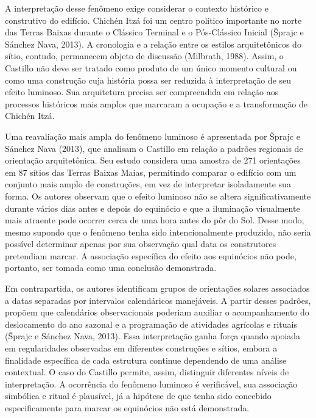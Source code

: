 \documentclass[11pt, a4paper]{article}
\begin{document}
A interpretação desse fenômeno exige considerar o contexto histórico e construtivo do edifício. Chichén Itzá foi um centro político importante no norte das Terras Baixas durante o Clássico Terminal e o Pós-Clássico Inicial (Šprajc e Sánchez Nava, 2013). A cronologia e a relação entre os estilos arquitetônicos do sítio, contudo, permanecem objeto de discussão (Milbrath, 1988). Assim, o Castillo não deve ser tratado como produto de um único momento cultural ou como uma construção cuja história possa ser reduzida à interpretação de seu efeito luminoso. Sua arquitetura precisa ser compreendida em relação aos processos históricos mais amplos que marcaram a ocupação e a transformação de Chichén Itzá.

Uma reavaliação mais ampla do fenômeno luminoso é apresentada por Šprajc e Sánchez Nava (2013), que analisam o Castillo em relação a padrões regionais de orientação arquitetônica. Seu estudo considera uma amostra de 271 orientações em 87 sítios das Terras Baixas Maias, permitindo comparar o edifício com um conjunto mais amplo de construções, em vez de interpretar isoladamente sua forma. Os autores observam que o efeito luminoso não se altera significativamente durante vários dias antes e depois do equinócio e que a iluminação visualmente mais atraente pode ocorrer cerca de uma hora antes do pôr do Sol. Desse modo, mesmo supondo que o fenômeno tenha sido intencionalmente produzido, não seria possível determinar apenas por sua observação qual data os construtores pretendiam marcar. A associação específica do efeito aos equinócios não pode, portanto, ser tomada como uma conclusão demonstrada.

Em contrapartida, os autores identificam grupos de orientações solares associados a datas separadas por intervalos calendáricos manejáveis. A partir desses padrões, propõem que calendários observacionais poderiam auxiliar o acompanhamento do deslocamento do ano sazonal e a programação de atividades agrícolas e rituais (Šprajc e Sánchez Nava, 2013). Essa interpretação ganha força quando apoiada em regularidades observadas em diferentes construções e sítios, embora a finalidade específica de cada estrutura continue dependendo de uma análise contextual. O caso do Castillo permite, assim, distinguir diferentes níveis de interpretação. A ocorrência do fenômeno luminoso é verificável, sua associação simbólica e ritual é plausível, já a hipótese de que tenha sido concebido especificamente para marcar os equinócios não está demonstrada.
\end{document}

